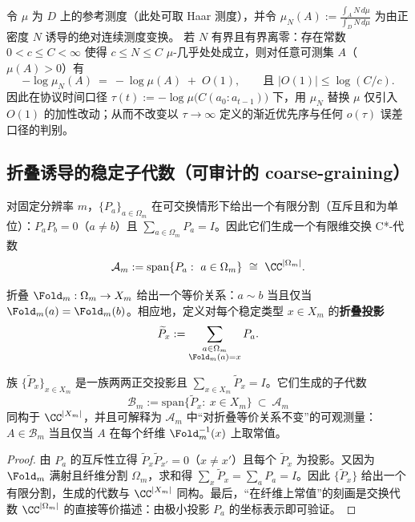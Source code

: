 \begin{corollary}\label{cor:op-algebra-lapse-time-gauge-invariance}
令 \(\mu\) 为 \(D\) 上的参考测度（此处可取 Haar 测度），并令
\(
\mu_N(A):=\frac{\int_A N\,d\mu}{\int_D N\,d\mu}
\)
为由正密度 \(N\) 诱导的绝对连续测度变换。
若 \(N\) 有界且有界离零：存在常数 \(0<c\le C<\infty\) 使得 \(c\le N\le C\) \(\mu\)-几乎处处成立，则对任意可测集 \(A\)（\(\mu(A)>0\)）有
\[
-\log\mu_N(A)
~=~
-\log\mu(A)\;+\;O(1),
\qquad
\text{且 }|O(1)|\le \log(C/c).
\]
因此在协议时间口径
\(
\tau(t):=-\log\mu\bigl(C(a_0{:}a_{t-1})\bigr)
\)
下，用 \(\mu_N\) 替换 \(\mu\) 仅引入 \(O(1)\) 的加性改动；从而不改变以 \(\tau\to\infty\) 定义的渐近优先序与任何 \(o(\tau)\) 误差口径的判别。
\end{corollary}

\subsection{折叠诱导的稳定子代数（可审计的 coarse-graining）}\label{app:op-algebra-fold-subalgebra}

对固定分辨率 $m$，$\{P_a\}_{a\in\Omega_m}$ 在可交换情形下给出一个有限分割（互斥且和为单位）：$P_aP_b=0$（$a\neq b$）且 $\sum_{a\in\Omega_m}P_a=I$。因此它们生成一个有限维交换 C*-代数
\[
\mathcal{A}_m:=\mathrm{span}\{P_a:\ a\in\Omega_m\}\ \cong\ \CC^{|\Omega_m|}.
\]

折叠 $\Fold_m:\Omega_m\to X_m$ 给出一个等价关系：$a\sim b$ 当且仅当 $\Fold_m(a)=\Fold_m(b)$。相应地，定义对每个稳定类型 $x\in X_m$ 的\textbf{折叠投影}
\[
\widetilde P_x:=\sum_{\substack{a\in\Omega_m\\ \Fold_m(a)=x}} P_a.
\]

\begin{proposition}[折叠不变量子代数]\label{prop:fold-invariant-subalgebra}
族 $\{\widetilde P_x\}_{x\in X_m}$ 是一族两两正交投影且 $\sum_{x\in X_m}\widetilde P_x=I$。它们生成的子代数
\[
\mathcal{B}_m:=\mathrm{span}\{\widetilde P_x:\ x\in X_m\}\ \subset\ \mathcal{A}_m
\]
同构于 $\CC^{|X_m|}$，并且可解释为 $\mathcal{A}_m$ 中“对折叠等价关系不变”的可观测量：$A\in\mathcal{B}_m$ 当且仅当 $A$ 在每个纤维 $\Fold_m^{-1}(x)$ 上取常值。
\end{proposition}

\begin{proof}
由 $P_a$ 的互斥性立得 $\widetilde P_x\widetilde P_{x'}=0$（$x\neq x'$）且每个 $\widetilde P_x$ 为投影。又因为 $\Fold_m$ 满射且纤维分割 $\Omega_m$，求和得 $\sum_{x}\widetilde P_x=\sum_{a}P_a=I$。因此 $\{\widetilde P_x\}$ 给出一个有限分割，生成的代数与 $\CC^{|X_m|}$ 同构。最后，“在纤维上常值”的刻画是交换代数 $\CC^{|\Omega_m|}$ 的直接等价描述：由极小投影 $P_a$ 的坐标表示即可验证。
\end{proof}

